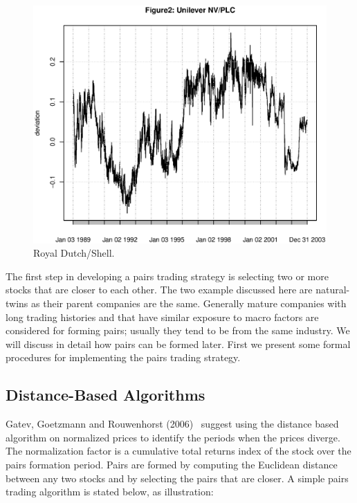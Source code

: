 	\begin{figure}[!ht]
	\centering
	\includegraphics[width=\textwidth]{chapters/chapter_stat_ts/figures/472.eps}
	\caption{Royal Dutch/Shell. \label{fig:3nvplc}}
	\end{figure}

The first step in developing a pairs trading strategy is selecting two or more stocks that are closer to each other. The two example discussed here are natural-twins as their parent companies are the same. Generally mature companies with long trading histories and that have similar exposure to macro factors are considered for forming pairs; usually they tend to be from the same industry. We will discuss in detail how pairs can be formed later. First we present some formal procedures for implementing the pairs trading strategy.


\subsection{Distance-Based Algorithms}


Gatev, Goetzmann and Rouwenhorst (2006)~\cite{ggr} suggest using the distance based algorithm on normalized prices to identify the periods when the prices diverge. The normalization factor is a cumulative total returns index of the stock over the pairs formation period. Pairs are formed by computing the Euclidean distance between any two stocks and by selecting the pairs that are closer. A simple pairs trading algorithm is stated below, as illustration: \\

